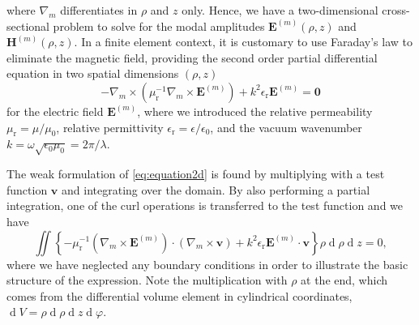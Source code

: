 \documentclass[a4paper,12pt]{article}
\renewcommand{\vec}[1]{\boldsymbol{#1}}
\newcommand{\mrm}[1]{\mathrm{#1}}
\newcommand{\diff}{\operatorname{d}\!}
\newcommand{\ju}{\mrm{j}}
\newcommand{\Ev}{\vec{E}}
\newcommand{\Hv}{\vec{H}}
\newcommand{\Zv}{\vec{0}}
\newcommand{\vv}{\vec{v}}
\begin{document}
where $\nabla_{m}$ differentiates in $\rho$ and $z$ only. Hence, we
have a two-dimensional cross-sectional problem to solve for the modal
amplitudes $\Ev^{(m)}(\rho,z)$ and $\Hv^{(m)}(\rho,z)$. In a finite
element context, it is customary to use Faraday's law to eliminate the
magnetic field, providing the second order partial differential
equation in two spatial dimensions $(\rho,z)$
\begin{equation}
  -\nabla_{m}\times(\mu_{\mrm{r}}^{-1}\nabla_{m}\times\Ev^{(m)}) + k^{2}\epsilon_{\mrm{r}}\Ev^{(m)} = \Zv
  \label{eq:equation2d}
\end{equation}
for the electric field $\Ev^{(m)}$, where we introduced the relative
permeability $\mu_{\mrm{r}} = \mu/\mu_{0}$, relative permittivity
$\epsilon_{\mrm{r}} = \epsilon/\epsilon_{0}$, and the vacuum
wavenumber $k = \omega\sqrt{\epsilon_{0}\mu_{0}} = 2\pi/\lambda$.

The weak formulation of \eqref{eq:equation2d} is found by multiplying
with a test function $\vv$ and integrating over the domain. By also
performing a partial integration, one of the curl operations is
transferred to the test function and we have
\begin{equation}
  \iint \left\{ -\mu_{\mrm{r}}^{-1}(\nabla_{m}\times\Ev^{(m)})\cdot(\nabla_{m}\times\vv) + k^{2}\epsilon_{\mrm{r}}\Ev^{(m)}\cdot\vv\right\} \rho\diff\rho\diff z = 0,
  \label{eq:weakformulation2d}
\end{equation}
where we have neglected any boundary conditions in order to illustrate
the basic structure of the expression. Note the multiplication with
$\rho$ at the end, which comes from the differential volume element in
cylindrical coordinates, $\diff V = \rho\diff\rho\diff z\diff\varphi$.
\end{document}

